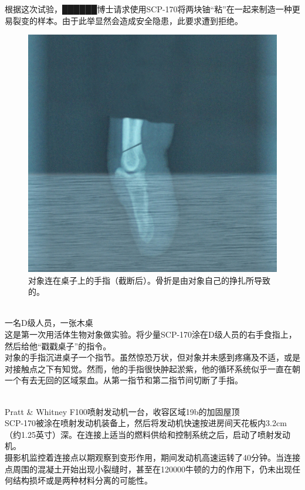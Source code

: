 根据这次试验，██████博士请求使用SCP-170将两块铀“粘”在一起来制造一种更易裂变的样本。由于此举显然会造成安全隐患，此要求遭到拒绝。

\begin{figure}[H]
    \centering
    \includegraphics[width=0.5\linewidth]{images/SCP-170.jpg}
    \caption*{对象连在桌子上的手指（截断后）。骨折是由对象自己的挣扎所导致的。}
\end{figure}

\\
一名D级人员，一张木桌\\
这是第一次用活体生物对象做实验。将少量SCP-170涂在D级人员的右手食指上，然后给他“戳戳桌子”的指令。\\
对象的手指沉进桌子一个指节。虽然惊恐万状，但对象并未感到疼痛及不适，或是对接触点之下有知觉。然而，他的手指很快肿起淤紫，他的循环系统似乎一直在朝一个有去无回的区域泵血。从第一指节和第二指节间切断了手指。

\\
Pratt \& Whitney F100喷射发动机一台，收容区域19b的加固屋顶\\
SCP-170被涂在喷射发动机装备上，然后将发动机快速按进房间天花板内3.2cm（约1.25英寸）深。在连接上适当的燃料供给和控制系统之后，启动了喷射发动机。\\
摄影机监控着连接点以期观察到变形作用，期间发动机高速运转了40分钟。当连接点周围的混凝土开始出现小裂缝时，甚至在120000牛顿的力的作用下，仍未出现任何结构损坏或是两种材料分离的可能性。
